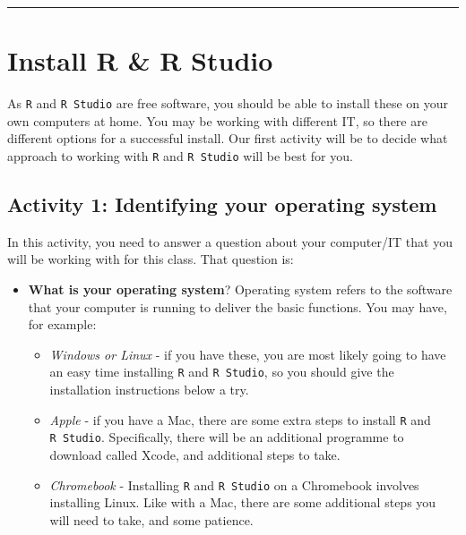 \documentclass[
]{book}
\providecommand{\tightlist}{%
  \setlength{\itemsep}{0pt}\setlength{\parskip}{0pt}}
\begin{document}
\begin{center}\rule{0.5\linewidth}{0.5pt}\end{center}

\hypertarget{install-r-r-studio}{%
\section{Install R \& R Studio}\label{install-r-r-studio}}

As \texttt{R} and \texttt{R\ Studio} are free software, you should be able to install these on your own computers at home. You may be working with different IT, so there are different options for a successful install. Our first activity will be to decide what approach to working with \texttt{R} and \texttt{R\ Studio} will be best for you.

\hypertarget{activity-1-identifying-your-operating-system}{%
\subsection{Activity 1: Identifying your operating system}\label{activity-1-identifying-your-operating-system}}

In this activity, you need to answer a question about your computer/IT that you will be working with for this class. That question is:

\begin{itemize}
\item
  \textbf{What is your operating system}? Operating system refers to the software that your computer is running to deliver the basic functions. You may have, for example:

  \begin{itemize}
  \tightlist
  \item
    \emph{Windows or Linux} - if you have these, you are most likely going to have an easy time installing \texttt{R} and \texttt{R\ Studio}, so you should give the installation instructions below a try.
  \item
    \emph{Apple} - if you have a Mac, there are some extra steps to install \texttt{R} and \texttt{R\ Studio}. Specifically, there will be an additional programme to download called Xcode, and additional steps to take.\\
  \item
    \emph{Chromebook} - Installing \texttt{R} and \texttt{R\ Studio} on a Chromebook involves installing Linux. Like with a Mac, there are some additional steps you will need to take, and some patience.
  \end{itemize}
\end{itemize}
\end{document}
